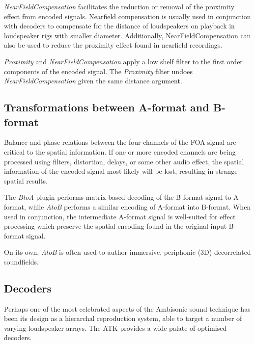 \documentclass{article}
\begin{document}
\emph{NearFieldCompensation} facilitates the reduction or removal of the proximity effect from encoded signals.
Near\-field compensation is usually used in conjunction with decoders to compensate for the distance of loudspeakers on playback in loudspeaker rigs with smaller diameter.
Additionally, NearFieldCompensation can also be used to reduce the proximity effect found in nearfield recordings.

\emph{Proximity} and \emph{NearFieldCompensation} apply a low shelf filter to the first order components of the encoded signal.
The \emph{Proximity} filter undoes \emph{NearFieldCompensation} given the same distance argument.


\subsection{Transformations between A-format and B-format}\label{sec:a-format}

Balance and phase relations between the four channels of the FOA signal are critical to the spatial information.
If one or more encoded channels are being processed using filters, distortion, delays, or some other audio effect, the spatial information of the encoded signal most likely will be lost, resulting in strange spatial results.

The \emph{BtoA} plugin performs matrix-based decoding of the B-format signal to A-format, while \emph{AtoB} performs a similar encoding of A-format into B-format.
When used in conjunction, the intermediate A-format signal is well-suited for effect processing which preserve the spatial encoding found in the original input B-format signal.

On its own, \emph{AtoB} is often used to author immersive, periphonic (3D) decorrelated soundfields.




\subsection{Decoders}\label{sec:decoders}

Perhaps one of the most celebrated aspects of the Ambisonic sound technique has been its design as a hierarchal reproduction system, able to target a number of varying loudspeaker arrays.
The ATK provides a wide palate of optimised decoders.
\end{document}
